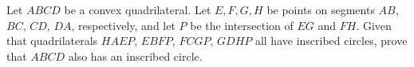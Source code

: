 Let $ABCD$ be a convex quadrilateral. Let $E,F,G,H$ be points on segments $AB$, $BC$, $CD$, $DA$, respectively, and let $P$ be the intersection of $EG$ and $FH$. Given that quadrilaterals $HAEP$, $EBFP$, $FCGP$, $GDHP$ all have inscribed circles, prove that $ABCD$ also has an inscribed circle.